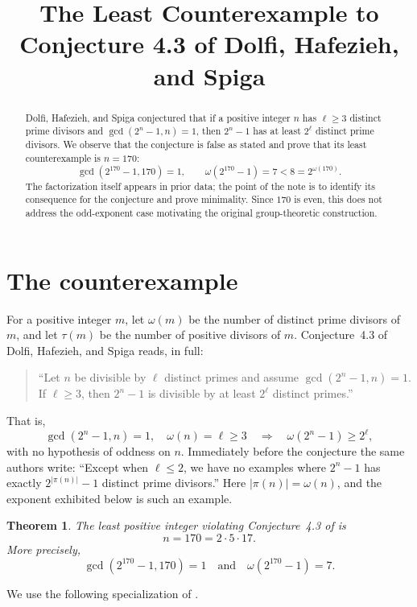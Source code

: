 \documentclass[11pt]{amsart}
\title[Least Counterexample to Conjecture 4.3]
{The Least Counterexample to Conjecture 4.3 of Dolfi, Hafezieh, and Spiga}
\date{}
\newtheorem{theorem}{Theorem}
\theoremstyle{remark}
\begin{document}
\begin{abstract}
Dolfi, Hafezieh, and Spiga conjectured that if a positive integer $n$
has $\ell\ge 3$ distinct prime divisors and $\gcd(2^n-1,n)=1$, then
$2^n-1$ has at least $2^\ell$ distinct prime divisors. We observe that
the conjecture is false as stated and prove that its least counterexample
is $n=170$:
\[
\gcd(2^{170}-1,170)=1,
\qquad
\omega(2^{170}-1)=7<8=2^{\omega(170)}.
\]
The factorization itself appears in prior data; the point of the note is
to identify its consequence for the conjecture and prove minimality.
Since $170$ is even, this does not address the odd-exponent case
motivating the original group-theoretic construction.
\end{abstract}

\maketitle

\section{The counterexample}

For a positive integer $m$, let $\omega(m)$ be the number of distinct
prime divisors of $m$, and let $\tau(m)$ be the number of positive
divisors of $m$. Conjecture~4.3 of Dolfi, Hafezieh, and Spiga
\cite{DHS} reads, in full:
\begin{quote}
``Let $n$ be divisible by $\ell$ distinct primes and assume
$\gcd(2^n-1,n)=1$. If $\ell\ge3$, then $2^n-1$ is divisible by at
least $2^\ell$ distinct primes.''
\end{quote}
That is,
\[
\gcd(2^n-1,n)=1,
\quad \omega(n)=\ell\ge 3
\quad\Longrightarrow\quad
\omega(2^n-1)\ge 2^\ell,
\]
with no hypothesis of oddness on $n$. Immediately before the
conjecture the same authors write: ``Except when $\ell\le2$, we have no
examples where $2^n-1$ has exactly $2^{|\pi(n)|}-1$ distinct prime
divisors.'' Here $|\pi(n)|=\omega(n)$, and the exponent exhibited below
is such an example.

\begin{theorem}\label{thm:main}
The least positive integer violating Conjecture~4.3 of \cite{DHS} is
\[
n=170=2\cdot5\cdot17.
\]
More precisely,
\[
\gcd(2^{170}-1,170)=1
\quad\text{and}\quad
\omega(2^{170}-1)=7.
\]
\end{theorem}

We use the following specialization of \cite[Lemma~4.2]{DHS}.
\end{document}

